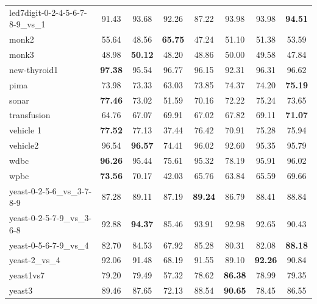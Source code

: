 \begin{table}[!p]
{\begin{tabular}{lccccccc}
led7digit-0-2-4-5-6-7-8-9\_vs\_1 & 91.43 & 93.68 & 92.26 & 87.22 & 93.98 & 93.98 & \textbf{94.51} \\
monk2 & 55.64 & 48.56 & \textbf{65.75} & 47.24 & 51.10 & 51.38 & 53.59 \\
monk3 & 48.98 & \textbf{50.12} & 48.20 & 48.86 & 50.00 & 49.58 & 47.84 \\
new-thyroid1 & \textbf{97.38} & 95.54 & 96.77 & 96.15 & 92.31 & 96.31 & 96.62 \\
pima & 73.98 & 73.33 & 63.03 & 73.85 & 74.37 & 74.20 & \textbf{75.19} \\
sonar & \textbf{77.46} & 73.02 & 51.59 & 70.16 & 72.22 & 75.24 & 73.65 \\
transfusion & 64.76 & 67.07 & 69.91 & 67.02 & 67.82 & 69.11 & \textbf{71.07} \\
vehicle 1 & \textbf{77.52} & 77.13 & 37.44 & 76.42 & 70.91 & 75.28 & 75.94 \\
vehicle2 & 96.54 & \textbf{96.57} & 74.41 & 96.02 & 92.60 & 95.35 & 95.79 \\
wdbc & \textbf{96.26} & 95.44 & 75.61 & 95.32 & 78.19 & 95.91 & 96.02 \\
wpbc & \textbf{73.56} & 70.17 & 42.03 & 65.76 & 63.84 & 65.59 & 69.66 \\
yeast-0-2-5-6\_vs\_3-7-8-9 & 87.28 & 89.11 & 87.19 & \textbf{89.24} & 86.79 & 88.41 & 88.84 \\
yeast-0-2-5-7-9\_vs\_3-6-8 & 92.88 & \textbf{94.37} & 85.46 & 93.91 & 92.98 & 92.65 & 90.43 \\
yeast-0-5-6-7-9\_vs\_4 & 82.70 & 84.53 & 67.92 & 85.28 & 80.31 & 82.08 & \textbf{88.18} \\
yeast-2\_vs\_4 & 92.06 & 91.48 & 68.19 & 91.55 & 89.10 & \textbf{92.26} & 90.84 \\
yeast1vs7 & 79.20 & 79.49 & 57.32 & 78.62 & \textbf{86.38} & 78.99 & 79.35 \\
yeast3 & 89.46 & 87.65 & 72.13 & 88.54 & \textbf{90.65} & 78.45 & 86.55 \\
\bottomrule
\end{tabular}}
\end{table}
